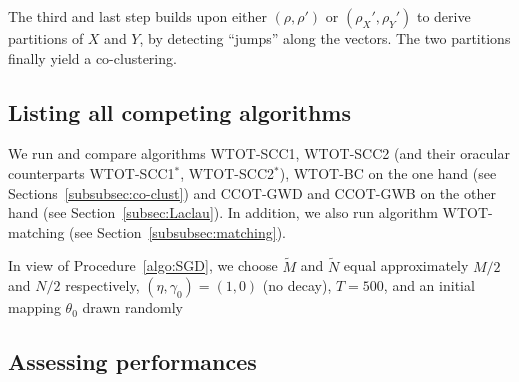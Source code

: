 The   third  and   last   step   builds  upon   either   $(\rho,  \rho')$   or
$(\rho_{X}', \rho_{Y}')$  to derive  partitions of $X$  and $Y$,  by detecting
``jumps''   along  the   vectors.   The   two  partitions   finally  yield   a
co-clustering.


\subsection{Listing all competing algorithms}
\label{subsec:competition}

We  run  and  compare  algorithms WTOT-SCC1,  WTOT-SCC2  (and  their  oracular
counterparts  WTOT-SCC1$^*$,  WTOT-SCC2$^*$), WTOT-BC  on  the  one hand  (see
Sections~\ref{subsubsec:co-clust}) and CCOT-GWD and CCOT-GWB on the other hand
(see  Section~\ref{subsec:Laclau}).   In  addition,   we  also  run  algorithm
WTOT-matching (see Section~\ref{subsubsec:matching}). 


In   view  of   Procedure~\ref{algo:SGD},   we   choose  $\widetilde{M}$   and
$\widetilde{N}$   equal   approximately    $M/2$   and   $N/2$   respectively,
$(\eta, \gamma_{0})  = (1,0)$ (no  decay), $T =  500$, and an  initial mapping
$\theta_{0}$   drawn   randomly  



\subsection{Assessing performances}
\label{subsec:criteria}

